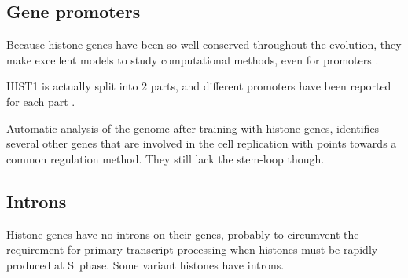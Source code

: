   \subsection{Gene promoters}

    Because histone genes have been so well conserved throughout the evolution, they make
    excellent models to study computational methods, even for promoters
    \citep{histone-promoter-modeling}.

    HIST1 is actually split into 2 parts, and different promoters have been reported for each
    part \citep{HISTOne-different-transcripts}.

    Automatic analysis of the genome after training with histone genes, identifies
    several other genes that are involved in the cell replication with points
    towards a common regulation method. They still lack the stem-loop though.

  \subsection{Introns}
    Histone genes have no introns on their genes, probably to circumvent the
    requirement for primary transcript processing when histones must be rapidly
    produced at S~phase. Some variant histones have introns.
